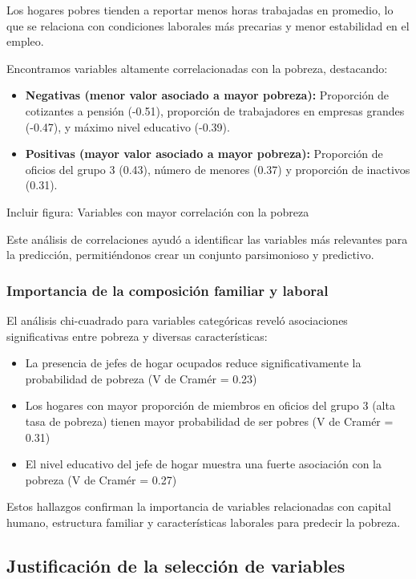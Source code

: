 \documentclass[12pt,a4paper,onecolumn]{article}
\begin{document}
Los hogares pobres tienden a reportar menos horas trabajadas en promedio, lo que se relaciona con condiciones laborales más precarias y menor estabilidad en el empleo.

Encontramos variables altamente correlacionadas con la pobreza, destacando:
\begin{itemize}
    \item \textbf{Negativas (menor valor asociado a mayor pobreza):} Proporción de cotizantes a pensión (-0.51), proporción de trabajadores en empresas grandes (-0.47), y máximo nivel educativo (-0.39).
    \item \textbf{Positivas (mayor valor asociado a mayor pobreza):} Proporción de oficios del grupo 3 (0.43), número de menores (0.37) y proporción de inactivos (0.31).
\end{itemize}

{\color{blue} Incluir figura: Variables con mayor correlación con la pobreza}

Este análisis de correlaciones ayudó a identificar las variables más relevantes para la predicción, permitiéndonos crear un conjunto parsimonioso y predictivo.

\subsubsection{Importancia de la composición familiar y laboral}

El análisis chi-cuadrado para variables categóricas reveló asociaciones significativas entre pobreza y diversas características:

\begin{itemize}
    \item La presencia de jefes de hogar ocupados reduce significativamente la probabilidad de pobreza (V de Cramér = 0.23)
    \item Los hogares con mayor proporción de miembros en oficios del grupo 3 (alta tasa de pobreza) tienen mayor probabilidad de ser pobres (V de Cramér = 0.31)
    \item El nivel educativo del jefe de hogar muestra una fuerte asociación con la pobreza (V de Cramér = 0.27)
\end{itemize}

Estos hallazgos confirman la importancia de variables relacionadas con capital humano, estructura familiar y características laborales para predecir la pobreza.

\subsection{Justificación de la selección de variables}
\end{document}
